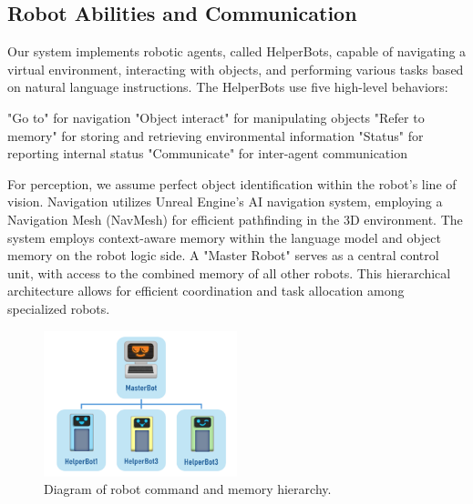 \documentclass[pdflatex,sn-mathphys-num]{sn-jnl}%
\theoremstyle{thmstyleone}
\theoremstyle{thmstyletwo}%
\theoremstyle{thmstylethree}%
\begin{document}
\subsection{Robot Abilities and Communication}
Our system implements robotic agents, called HelperBots, capable of navigating a virtual environment, interacting with objects, and performing various tasks based on natural language instructions. The HelperBots use five high-level behaviors:

"Go to" for navigation
"Object interact" for manipulating objects
"Refer to memory" for storing and retrieving environmental information
"Status" for reporting internal status
"Communicate" for inter-agent communication

For perception, we assume perfect object identification within the robot's line of vision. Navigation utilizes Unreal Engine's AI navigation system, employing a Navigation Mesh (NavMesh) for efficient pathfinding in the 3D environment.
The system employs context-aware memory within the language model and object memory on the robot logic side. A "Master Robot" serves as a central control unit, with access to the combined memory of all other robots. This hierarchical architecture allows for efficient coordination and task allocation among specialized robots.

\begin{figure}[H]
\centering
\includegraphics[width=0.5\textwidth]{figures/Picture6.png}
\caption{Diagram of robot command and memory hierarchy.}\label{fig9}
\end{figure}
\end{document}
